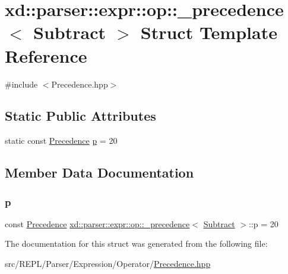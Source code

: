 \hypertarget{structxd_1_1parser_1_1expr_1_1op_1_1__precedence_3_01_subtract_01_4}{}\section{xd\+:\+:parser\+:\+:expr\+:\+:op\+:\+:\+\_\+precedence$<$ Subtract $>$ Struct Template Reference}
\label{structxd_1_1parser_1_1expr_1_1op_1_1__precedence_3_01_subtract_01_4}


{\ttfamily \#include $<$Precedence.\+hpp$>$}

\subsection*{Static Public Attributes}
\begin{DoxyCompactItemize}
\item 
static const \mbox{\hyperlink{namespacexd_1_1parser_1_1expr_1_1op_ae27abd4a02cd8125663cb2bacac299b2}{Precedence}} \mbox{\hyperlink{structxd_1_1parser_1_1expr_1_1op_1_1__precedence_3_01_subtract_01_4_a4b3fa94c439833a11c1e6482bfc957b4}{p}} = 20
\end{DoxyCompactItemize}


\subsection{Member Data Documentation}
\mbox{\label{structxd_1_1parser_1_1expr_1_1op_1_1__precedence_3_01_subtract_01_4_a4b3fa94c439833a11c1e6482bfc957b4}} 
\subsubsection{\texorpdfstring{p}{p}}
{\footnotesize\ttfamily const \mbox{\hyperlink{namespacexd_1_1parser_1_1expr_1_1op_ae27abd4a02cd8125663cb2bacac299b2}{Precedence}} \mbox{\hyperlink{structxd_1_1parser_1_1expr_1_1op_1_1__precedence}{xd\+::parser\+::expr\+::op\+::\+\_\+precedence}}$<$ \mbox{\hyperlink{structxd_1_1parser_1_1expr_1_1op_1_1_subtract}{Subtract}} $>$\+::p = 20\hspace{0.3cm}{\ttfamily [static]}}



The documentation for this struct was generated from the following file\+:\begin{DoxyCompactItemize}
\item 
src/\+R\+E\+P\+L/\+Parser/\+Expression/\+Operator/\mbox{\hyperlink{_precedence_8hpp}{Precedence.\+hpp}}\end{DoxyCompactItemize}

